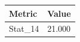 \begin{tabular}{ll}
\toprule
Metric & Value \\
\midrule
Stat\_14 & 21.000 \\
\bottomrule
\end{tabular}
